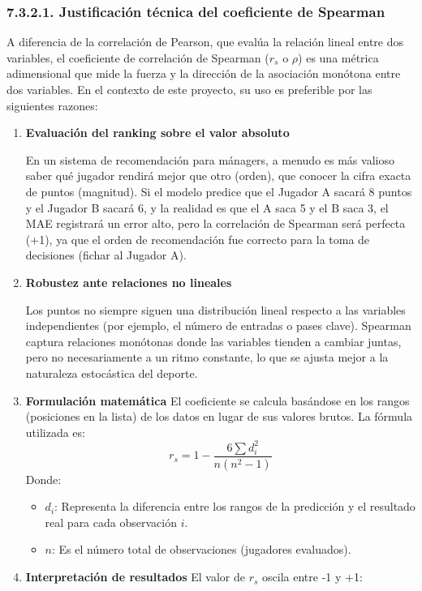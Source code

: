 \subsubsection{7.3.2.1. Justificación técnica del coeficiente de Spearman}
A diferencia de la correlación de Pearson, que evalúa la relación lineal entre
dos variables, el coeficiente de correlación de Spearman ($r_s$ o
$\rho$) es una métrica adimensional que mide la fuerza y la dirección de la
asociación monótona entre dos variables. En el contexto de este proyecto, su uso
es preferible por las siguientes razones:
\begin{enumerate}
\item \textbf{Evaluación del ranking sobre el valor absoluto}

En un sistema de recomendación para mánagers, a menudo es más valioso saber qué
jugador rendirá mejor que otro (orden), que conocer la cifra exacta de puntos
(magnitud). Si el modelo predice que el Jugador A sacará 8 puntos y el Jugador B
sacará 6, y la realidad es que el A saca 5 y el B saca 3, el MAE registrará un
error alto, pero la correlación de Spearman será perfecta (+1), ya que el orden
de recomendación fue correcto para la toma de decisiones (fichar al Jugador A).

\item \textbf{Robustez ante relaciones no lineales}

Los puntos no siempre siguen una distribución lineal respecto a
las variables independientes (por ejemplo, el número de entradas o pases clave).
Spearman captura relaciones monótonas donde las variables tienden a cambiar
juntas, pero no necesariamente a un ritmo constante, lo que se ajusta mejor a la
naturaleza estocástica del deporte.

\item \textbf{Formulación matemática}
El coeficiente se calcula basándose en los rangos (posiciones en la lista) de
los datos en lugar de sus valores brutos. La fórmula utilizada es:
$$r_s = 1 - \frac{6 \sum d_i^2}{n(n^2 - 1)}$$
Donde:
\begin{itemize}
\item $d_i$: Representa la diferencia entre los rangos de la predicción y el
resultado real para cada observación $i$.
\item $n$: Es el número total de observaciones (jugadores evaluados).
\end{itemize}

\item \textbf{Interpretación de resultados}
El valor de $r_s$ oscila entre -1 y +1:


\end{enumerate}
